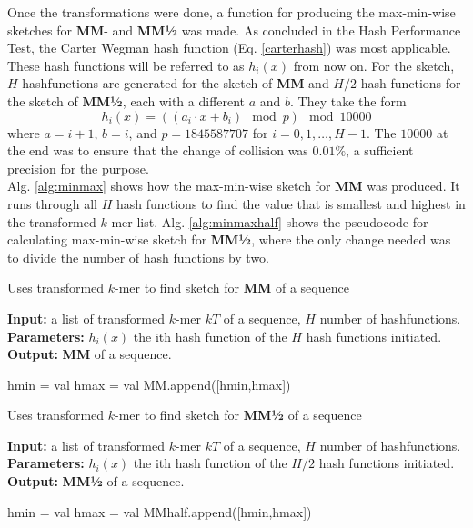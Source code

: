 \documentclass[../../main.tex]{subfiles}
\begin{document}
Once the transformations were done, a function for producing the max-min-wise sketches for {\bf MM}- and {\bf MM½} was made. As concluded in the Hash Performance Test, the Carter Wegman hash function (Eq. \ref{carterhash}) was most applicable. These hash functions will be referred to as $h_i(x)$ from now on. For the sketch, $H$ hashfunctions are generated for the sketch of {\bf MM} and $H/2$ hash functions for the sketch of {\bf MM½}, each with a different $a$ and $b$. They take the form 
$$
h_i(x)=((a_i\cdot x + b_i) \mod p )\mod 10000
$$
where $a=i+1$, $b=i$, and $p=1845587707$ for $i=0,1,\ldots,H-1$. The $10000$ at the end was to ensure that the change of collision was $0.01\%$, a sufficient precision for the purpose.\\

Alg. \ref{alg:minmax} shows how the max-min-wise sketch for {\bf MM} was produced. It runs through all $H$ hash functions to find the value that is smallest and highest in the transformed $k$-mer list. Alg. \ref{alg:minmaxhalf} shows the pseudocode for calculating max-min-wise sketch for {\bf MM½}, where the only change needed was to divide the number of hash functions by two.

\begin{algorithm}
\caption{Uses transformed $k$-mer to find sketch for {\bf MM} of a sequence}\label{alg:minmax}
\textbf{Input:} a list of transformed $k$-mer $kT$ of a sequence, $H$ number of hashfunctions.\\
\textbf{Parameters:} $h_i(x)$ the ith hash function of the $H$ hash functions initiated.\\
\textbf{Output:} {\bf MM} of a sequence.
\begin{algorithmic}[1]
\Statex
{}
				hmin = val
			\EndIf
				hmax = val
			\EndIf
		\EndFor
		\State MM.append([hmin,hmax])
	\EndFor
\State {}
\EndFunction
\end{algorithmic}
\end{algorithm}

\begin{algorithm}
\caption{Uses transformed $k$-mer to find sketch for {\bf MM½} of a sequence}\label{alg:minmaxhalf}
\textbf{Input:} a list of transformed $k$-mer $kT$ of a sequence, $H$ number of hashfunctions.\\
\textbf{Parameters:} $h_i(x)$ the ith hash function of the $H/2$ hash functions initiated.\\
\textbf{Output:} {\bf MM½} of a sequence.
\begin{algorithmic}[1]
\Statex
{}
				hmin = val
			\EndIf
				hmax = val
			\EndIf
		\EndFor
		\State MMhalf.append([hmin,hmax])
	\EndFor
\State {}
\EndFunction
\end{algorithmic}
\end{algorithm}
\end{document}
